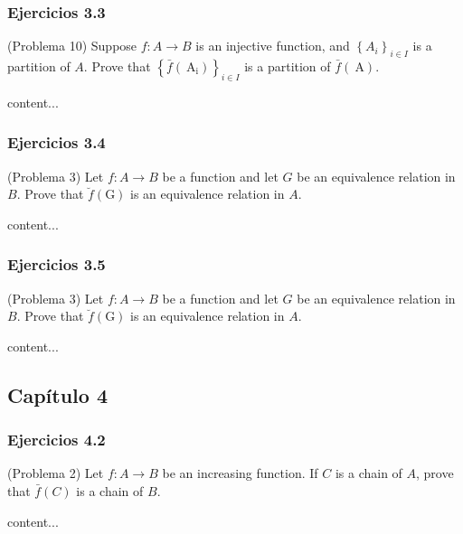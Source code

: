 \subsubsection{Ejercicios 3.3}
\begin{problema}(Problema 10)
	Suppose $f: A \rightarrow B$ is an injective function, and $\left\{A_{i}\right\}_{i \in I}$ is a partition of $A$. Prove that $\left\{\bar{f}\left(\mathrm{~A}_{\mathrm{i}}\right)\right\}_{i \in I}$ is a partition of $\bar{f}(\mathrm{~A})$.
	\begin{dem}
		content...
	\end{dem}
\end{problema}

\subsubsection{Ejercicios 3.4}
\begin{problema}(Problema 3)
	Let $f: A \rightarrow B$ be a function and let $G$ be an equivalence relation in $B$. Prove that $\breve{f}(\mathrm{G})$ is an equivalence relation in $A$.
	\begin{dem}
		content...
	\end{dem}
\end{problema}
\subsubsection{Ejercicios 3.5}
\begin{problema}(Problema 3)
	Let $f: A \rightarrow B$ be a function and let $G$ be an equivalence relation in $B$. Prove that $\breve{f}(\mathrm{G})$ is an equivalence relation in $A$.
	\begin{dem}
		content...
	\end{dem}
\end{problema}

\subsection{Capítulo 4}
\subsubsection{Ejercicios 4.2}
\begin{problema}(Problema 2)
	Let $f: A \rightarrow B$ be an increasing function. If $C$ is a chain of $A$, prove that $\bar{f}(C)$ is a chain of $B$.
	\begin{dem}
		content...
	\end{dem}
\end{problema}
